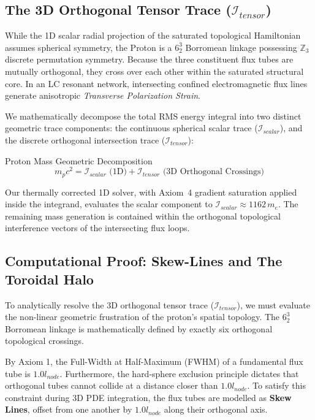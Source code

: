 \subsection{The 3D Orthogonal Tensor Trace ($\mathcal{I}_{tensor}$)}
While the 1D scalar radial projection of the saturated topological Hamiltonian assumes spherical symmetry, the Proton is a $6^3_2$ Borromean linkage possessing $\mathbb{Z}_3$ discrete permutation symmetry. Because the three constituent flux tubes are mutually orthogonal, they cross over each other within the saturated structural core. In an LC resonant network, intersecting confined electromagnetic flux lines generate anisotropic \textit{Transverse Polarization Strain}. 

We mathematically decompose the total RMS energy integral into two distinct geometric trace components: the continuous spherical scalar trace ($\mathcal{I}_{scalar}$), and the discrete orthogonal intersection trace ($\mathcal{I}_{tensor}$):
\begin{resultbox}{Proton Mass Geometric Decomposition}
\begin{equation}
m_p c^2 = \mathcal{I}_{scalar} \text{ (1D)} + \mathcal{I}_{tensor} \text{ (3D Orthogonal Crossings)}
\end{equation}
\end{resultbox}

Our thermally corrected 1D solver, with Axiom~4 gradient saturation applied inside the integrand, evaluates the scalar component to $\mathcal{I}_{scalar} \approx 1162\,m_e$. The remaining mass generation is contained within the orthogonal topological interference vectors of the intersecting flux loops.

\subsection{Computational Proof: Skew-Lines and The Toroidal Halo}
To analytically resolve the 3D orthogonal tensor trace ($\mathcal{I}_{tensor}$), we must evaluate the non-linear geometric frustration of the proton's spatial topology. The $6^3_2$ Borromean linkage is mathematically defined by exactly six orthogonal topological crossings.

By Axiom 1, the Full-Width at Half-Maximum (FWHM) of a fundamental flux tube is $1.0 l_{node}$. Furthermore, the hard-sphere exclusion principle dictates that orthogonal tubes cannot collide at a distance closer than $1.0 l_{node}$. To satisfy this constraint during 3D PDE integration, the flux tubes are modelled as \textbf{Skew Lines}, offset from one another by $1.0 l_{node}$ along their orthogonal axis.

